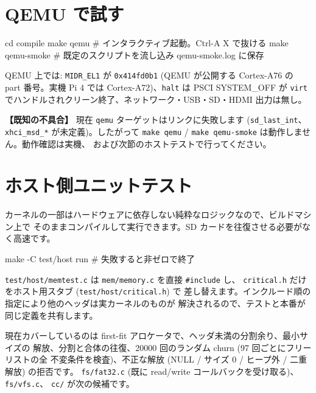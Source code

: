 \documentclass[a4paper,11pt]{ltjsarticle}
\begin{document}
\section{QEMU で試す}
\begin{code}
cd compile
make qemu          # インタラクティブ起動。Ctrl-A X で抜ける
make qemu-smoke    # 既定のスクリプトを流し込み qemu-smoke.log に保存
\end{code}
QEMU 上では: \verb|MIDR_EL1| が \verb|0x414fd0b1| (QEMU が公開する Cortex-A76 の
part 番号。実機 Pi 4 では Cortex-A72)、\verb|halt| は PSCI SYSTEM\_OFF が
\verb|virt| でハンドルされクリーン終了、ネットワーク・USB・SD・HDMI 出力は無し。

\textbf{【既知の不具合】} 現在 \verb|qemu| ターゲットはリンクに失敗します
(\verb|sd_last_int|、\verb|xhci_msd_*| が未定義)。したがって
\verb|make qemu| / \verb|make qemu-smoke| は動作しません。動作確認は実機、
および次節のホストテストで行ってください。

\section{ホスト側ユニットテスト}
カーネルの一部はハードウェアに依存しない純粋なロジックなので、ビルドマシン上で
そのままコンパイルして実行できます。SD カードを往復させる必要がなく高速です。
\begin{code}
make -C test/host run       # 失敗すると非ゼロで終了
\end{code}
\verb|test/host/memtest.c| は \verb|mem/memory.c| を直接 \verb|#include| し、
\verb|critical.h| だけをホスト用スタブ (\verb|test/host/critical.h|) で
差し替えます。インクルード順の指定により他のヘッダは実カーネルのものが
解決されるので、テストと本番が同じ定義を共有します。

現在カバーしているのは first-fit アロケータで、ヘッダ未満の分割余り、最小サイズの
解放、分割と合体の往復、20000 回のランダム churn (97 回ごとにフリーリストの全
不変条件を検査)、不正な解放 (NULL / サイズ 0 / ヒープ外 / 二重解放) の拒否です。
\verb|fs/fat32.c| (既に read/write コールバックを受け取る)、\verb|fs/vfs.c|、
\verb|cc/| が次の候補です。

\end{document}
